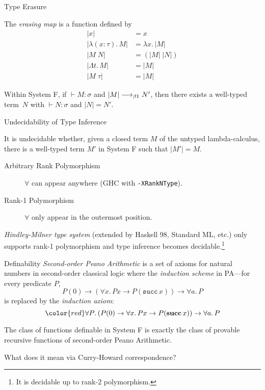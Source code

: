 \begin{frame}{Type Erasure}
\begin{definition}
  The \emph{erasing map} is a function defined by
  \begin{align*}
    |x| & = x \\
    |\lambda (x : \tau).\,M| & = \lambda x.\, |M| \\
    |M\;N| & = (|M|\;|N|) \\
    |\Lambda t.\, M| & = |M| \\
    |M\;\tau| & = |M|
  \end{align*}
\end{definition}

\begin{proposition}
  Within System F, if ${}\vdash M : \sigma$ and $|M|
  \longrightarrow_{\beta1} N'$, then there exists a well-typed term~$N$ with
  ${}\vdash N : \sigma$ and $|N| = N'$.
\end{proposition}
\end{frame}

\begin{frame}{Undecidability of Type Inference}
  \begin{theorem}
     It is undecidable whether, given a closed term $M$ of the untyped
     lambda-calculus, there is a well-typed term $M'$ in System F such that
     $|M'| = M$.  
  \end{theorem}

  \begin{description}
    \item[Arbitrary Rank Polymorphism] $\forall$ can appear
      anywhere {\small (GHC with \texttt{-XRankNType})}. 
    \item[Rank-1 Polymorphism]
      $\forall$ only appear in the outermost position.
  \end{description}
  \emph{Hindley-Milner type system} (extended by Haskell 98, Standard ML, etc.)
  only supports rank-1 polymorphism and type inference becomes
  decidable.\footnote{It is decidable up to rank-$2$ polymorphism.}
\end{frame}

\begin{frame}{Definability}
  \emph{Second-order Peano Arithmetic} is a set of axioms for natural numbers in
  second-order classical logic where the \emph{induction scheme} in PA---for
  every predicate $P$, 
  \[
    P(0) \to (\forall x.\, Px \to P(\mathtt{succ}\,x)) \to \forall a.\,P
  \]
  is replaced by the \emph{induction axiom}:
  \[
    {\color{red} \forall P}.\,(P(0) \to
    \forall x.\,Px \to P(\mathbf{succ}\,x)) \to 
    \forall a.\, P
  \]
  \begin{theorem}[Girard]
    The class of functions definable in System F is exactly 
    the class of provable recursive functions of second-order Peano Arithmetic.
  \end{theorem}
  
  What does it mean via Curry-Howard correspondence? 
\end{frame}

